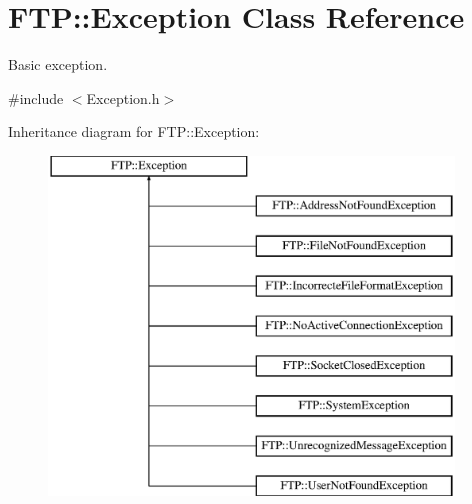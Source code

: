 \hypertarget{classFTP_1_1Exception}{}\section{F\+T\+P\+:\+:Exception Class Reference}
\label{classFTP_1_1Exception}


Basic exception.  




{\ttfamily \#include $<$Exception.\+h$>$}

Inheritance diagram for F\+T\+P\+:\+:Exception\+:\begin{figure}[H]
\begin{center}
\leavevmode
\includegraphics[height=9.000000cm]{classFTP_1_1Exception}
\end{center}
\end{figure}
